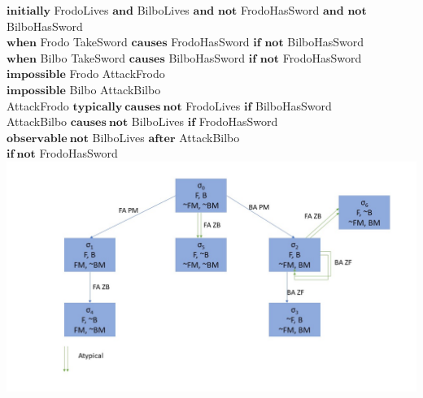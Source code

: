 \documentclass[11pt,a4paper]{article}
\begin{document}
    \begin{center}
    $\mathbf{initially}$ FrodoLives $\mathbf{and}$ BilboLives $\mathbf{and}$ $\mathbf{not}$ FrodoHasSword $\mathbf{and}$ $\mathbf{not}$ BilboHasSword\\
    
    $\mathbf{when}$ Frodo TakeSword $\mathbf{causes}$ FrodoHasSword $\mathbf{if}$ $\mathbf{not}$ BilboHasSword\\
    
    $\mathbf{when}$ Bilbo TakeSword $\mathbf{causes}$ BilboHasSword $\mathbf{if}$ $\mathbf{not}$ FrodoHasSword\\
    
    $\mathbf{impossible}$ Frodo AttackFrodo\\
    
    $\mathbf{impossible}$ Bilbo AttackBilbo\\
    
    AttackFrodo $\mathbf{typically} ~ \mathbf{causes~not}$ FrodoLives $\mathbf{if}$ BilboHasSword\\
    
    AttackBilbo $\mathbf{causes~not}$ BilboLives $\mathbf{if}$ FrodoHasSword\\
    
    $\mathbf{observable~not}$ BilboLives $\mathbf{after}$ AttackBilbo\\ $\mathbf{if~not}$ FrodoHasSword
    \includegraphics[width=\textwidth]{resources/graf.jpg} 
    \end{center}
 
\end{document}

